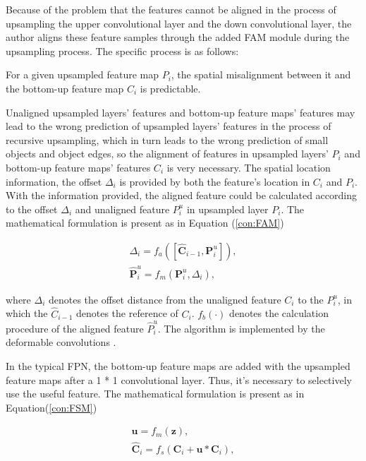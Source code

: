 Because of the problem that the features cannot be aligned in the process of upsampling the upper convolutional layer and the down convolutional layer, the author aligns these feature samples through the added FAM module during the upsampling process. The specific process is as follows:

For a given upsampled feature map $P_i$, the spatial misalignment between it and the bottom-up feature map $C_i$ is predictable.


Unaligned upsampled layers' features and bottom-up feature maps' features may lead to the wrong prediction of upsampled layers' features in the process of recursive upsampling, which in turn leads to the wrong prediction of small objects and object edges, so the alignment of features in upsampled layers' $P_i$ and bottom-up feature maps' features $C_i$ is very necessary. The spatial location information, the offset $\Delta_i$ is provided by both the feature's location in $C_i$ and $P_i$. With the information provided, the aligned feature could be calculated according to the offset $\Delta_i$ and unaligned feature $P^u_i$ in upsampled layer $P_i$. The mathematical formulation is present as in Equation (\ref{con:FAM}) \cite{huang2021fapn}

\begin{equation}
    \begin{aligned}
        \Delta_i = f_a([\hat{\textbf{C}}_{i-1}, \textbf{P}^u_i]),\\
    \hat{\textbf{P}}^u_i = f_m(\textbf{P}^u_i, \Delta_i),
    \label{con:FAM}
    \end{aligned}
\end{equation}

where $\Delta_i$ denotes the offset distance from the unaligned feature $C_i$ to the $P^u_i$, in which the $\hat{C}_{i-1}$ denotes the reference of $C_i$. $f_b(·)$ denotes the calculation procedure of the aligned feature $\hat{P}^u_i$. The algorithm is implemented by the deformable convolutions \cite{dai2017deformable}.


In the typical FPN, the bottom-up feature maps are added with the upsampled feature maps after a 1 * 1 convolutional layer. Thus, it's necessary to selectively use the useful feature. The mathematical formulation is present as in Equation(\ref{con:FSM}) \cite{huang2021fapn}

\begin{equation}
    \begin{aligned}
    \textbf{u} = f_m(\textbf{z}),\\
    \hat{\textbf{C}}_i = f_s(\textbf{C}_i+\textbf{u}*\textbf{C}_i),
    \label{con:FSM}
    \end{aligned}
\end{equation}

